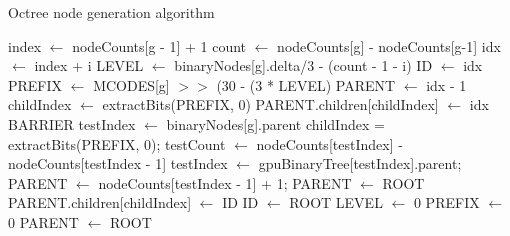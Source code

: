 \documentclass{thesis}
\begin{document}
\begin{algorithm}
    \label{alg:GenerateOctreeNodes}
    \caption{Octree node generation algorithm}
    \begin{algorithmic}
                \State index $\gets$ nodeCounts[g - 1] + 1
                \State count $\gets$ nodeCounts[g] - nodeCounts[g-1]
                        \State idx $\gets$ index + i
                        \State LEVEL $\gets$ binaryNodes[g].delta/3 - (count - 1 - i)
                        \State ID $\gets$ idx
                        \State PREFIX $\gets$ MCODES[g] $>>$ (30 - (3 * LEVEL)
                            \State PARENT $\gets$ idx - 1
                            \State childIndex $\gets$ extractBits(PREFIX, 0)
                            \State PARENT.children[childIndex] $\gets$ idx
                        \EndIf
                    \EndFor
                \EndIf
                \State BARRIER
                    \State testIndex $\gets$ binaryNodes[g].parent
                    \State childIndex = extractBits(PREFIX, 0);
                    \State testCount $\gets$ nodeCounts[testIndex] - nodeCounts[testIndex - 1]
                        \State testIndex $\gets$ gpuBinaryTree[testIndex].parent;
                    \EndWhile
                        \State PARENT $\gets$ nodeCounts[testIndex - 1] + 1;
                    \Else
                        \State PARENT $\gets$ ROOT
                    \EndIf
                    \State PARENT.children[childIndex] $\gets$ ID
                \EndIf
            \Else
                \State ID $\gets$ ROOT
                \State LEVEL $\gets$ 0
                \State PREFIX $\gets$ 0
                \State PARENT $\gets$ ROOT   
            \EndIf
        \EndFor
    \end{algorithmic}
\end{algorithm}

\end{document}
